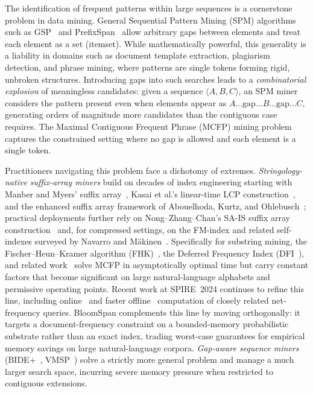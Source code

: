 \documentclass[runningheads]{llncs}
\begin{document}
    The identification of frequent patterns within large sequences is a cornerstone problem in data mining. General Sequential Pattern Mining (SPM) algorithms such as GSP~\cite{agrawal1995mining} and PrefixSpan~\cite{pei2001prefixspan} allow arbitrary gaps between elements and treat each element as a set (itemset). While mathematically powerful, this generality is a liability in domains such as document template extraction, plagiarism detection, and phrase mining, where patterns are single tokens forming rigid, unbroken structures. Introducing gaps into such searches leads to a \emph{combinatorial explosion} of meaningless candidates: given a sequence $\langle A, B, C \rangle$, an SPM miner considers the pattern present even when elements appear as $A \dots \text{gap} \dots B \dots \text{gap} \dots C$, generating orders of magnitude more candidates than the contiguous case requires. The Maximal Contiguous Frequent Phrase (MCFP) mining problem~\cite{fischer2006fast} captures the constrained setting where no gap is allowed and each element is a single token.

    Practitioners navigating this problem face a dichotomy of extremes. \emph{Stringology-native suffix-array miners} build on decades of index engineering starting with Manber and Myers' suffix array~\cite{manber1993suffix}, Kasai et al.'s linear-time LCP construction~\cite{kasai2001linear}, and the enhanced suffix array framework of Abouelhoda, Kurtz, and Ohlebusch~\cite{abouelhoda2004replacing}; practical deployments further rely on Nong--Zhang--Chan's SA-IS suffix array construction~\cite{nong2011saiis} and, for compressed settings, on the FM-index and related self-indexes surveyed by Navarro and M\"akinen~\cite{navarro2007compressed}. Specifically for substring mining, the Fischer--Heun--Kramer algorithm (FHK)~\cite{fischer2005icdm}, the Deferred Frequency Index (DFI~\cite{weese2008dfi}), and related work~\cite{kugel2008space,dhaliwal2012practical,fischer2008space} solve MCFP in asymptotically optimal time but carry constant factors that become significant on large natural-language alphabets and permissive operating points. Recent work at SPIRE~2024 continues to refine this line, including online~\cite{guo2024netfreq} and faster offline~\cite{ohlebusch2024chinese} computation of closely related net-frequency queries. BloomSpan complements this line by moving orthogonally: it targets a document-frequency constraint on a bounded-memory probabilistic substrate rather than an exact index, trading worst-case guarantees for empirical memory savings on large natural-language corpora. \emph{Gap-aware sequence miners} (BIDE+~\cite{wang2004bide}, VMSP~\cite{fournier2014vmsp}) solve a strictly more general problem and manage a much larger search space, incurring severe memory pressure when restricted to contiguous extensions.
\end{document}
